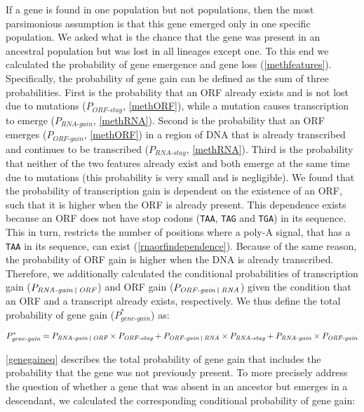 \documentclass[12pt,a4paper]{article}
\begin{document}
If a gene is found in one population but not populations, then the most parsimonious assumption is that this gene emerged only in one specific population. We asked what is the chance that the gene was present in an ancestral population but was lost in all lineages except one. To this end we calculated the probability of gene emergence and gene loss (\autoref{methfeatures}). Specifically, the probability of gene gain can be defined as the sum of three probabilities. First is the probability that an ORF already exists and is not lost due to mutations ($P_\textit{ORF-stay}$, \autoref{methORF}), while a mutation causes transcription to emerge ($P_\textit{RNA-gain}$, \autoref{methRNA}). Second is the probability that an ORF emerges ($P_\textit{ORF-gain}$, \autoref{methORF}) in a region of DNA that is already transcribed and continues to be transcribed ($P_\textit{RNA-stay}$, \autoref{methRNA}). Third is the probability that neither of the two features already exist and both emerge at the same time due to mutations (this probability is very small and is negligible). We found that the probability of transcription gain is dependent on the existence of an ORF, such that it is higher when the ORF is already present. This dependence exists because an ORF does not have stop codons (\texttt{TAA}, \texttt{TAG} and \texttt{TGA}) in its sequence. This in turn, restricts the number of positions where a poly-A signal, that has a \texttt{TAA} in its sequence, can exist (\autoref{rnaorfindependence}). Because of the same reason, the probability of ORF gain is higher when the DNA is already transcribed. Therefore, we additionally calculated the conditional probabilities of transcription gain ($P_\textit{RNA-gain \vline\ ORF}$) and ORF gain ($P_\textit{ORF-gain \vline\ RNA}$) given the condition that an ORF and a transcript already exists, respectively. We thus define the total probability of gene gain ($P_\textit{gene-gain}^*$) as:

\begin{equation}
P_\textit{gene-gain}^* = P_\textit{RNA-gain \vline\ ORF} \times P_\textit{ORF-stay} + P_\textit{ORF-gain \vline\ RNA} \times P_\textit{RNA-stay} + P_\textit{RNA-gain}\times P_\textit{ORF-gain}
\label{genegaineq}
\end{equation}

\autoref{genegaineq} describes the total probability of gene gain that includes the probability that the gene was not previously present. To more precisely address the question of whether a gene that was absent in an ancestor but emerges in a descendant, we calculated the corresponding conditional probability of gene gain:
\end{document}
